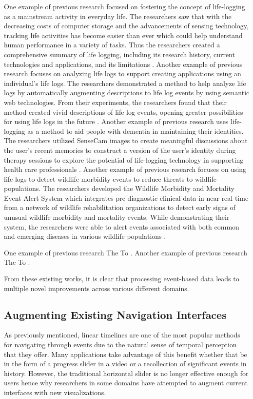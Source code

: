 \documentclass[doublespace,draft,nopageskip]{VTthesis} %
\begin{document}
One example of previous research focused on fostering the concept of life-logging as a mainstream activity in everyday life. The researchers saw that with the decreasing costs of computer storage and the advancements of sensing technology, tracking life activities has become easier than ever which could help understand human performance in a variety of tasks. Thus the researchers created a comprehensive summary of life logging, including its research history, current technologies and applications, and its limitations \cite{gurrinLifeLoggingPersonalBig2014}.
Another example of previous research focuses on analyzing life logs to support creating applications using an individual's life logs. The researchers demonstrated a method to help analyze life logs by automatically augmenting descriptions to life log events by using semantic web technologies. From their experiments, the researchers found that their method created vivid descriptions of life log events, opening greater possibilities for using life logs in the future \cite{mileoSemanticallyEnhancingMultimedia2014}.
Another example of previous research uses life-logging as a method to aid people with dementia in maintaining their identities. The researchers utilized SenseCam images to create meaningful discussions about the user's recent memories to construct a version of the user's identity during therapy sessions to explore the potential of life-logging technology in supporting health care professionals \cite{piasekUsingLifeloggingHelp2014}.
Another example of previous research focuses on using life logs to detect wildlife morbidity events to reduce threats to wildlife populations. The researchers developed the Wildlife Morbidity and Mortality Event Alert System which integrates pre-diagnostic clinical data in near real-time from a network of wildlife rehabilitation organizations to detect early signs of unusual wildlife morbidity and mortality events. While demonstrating their system, the researchers were able to alert events associated with both common and emerging diseases in various wildlife populations \cite{kellyEarlyDetectionWildlife2021}.


One example of previous research 
The 
To  \cite{}.
Another example of previous research 
The 
To  \cite{}.

From these existing works, it is clear that processing event-based data leads to multiple novel improvements across various different domains.

\subsection{Augmenting Existing Navigation Interfaces} \label{ss:this_subsection}
As previously mentioned, linear timelines are one of the most popular methods for navigating through events due to the natural sense of temporal perception that they offer. Many applications take advantage of this benefit whether that be in the form of a progress slider in a video or a recollection of significant events in history. However, the traditional horizontal slider is no longer effective enough for users hence why researchers in some domains have attempted to augment current interfaces with new visualizations.
\end{document}
